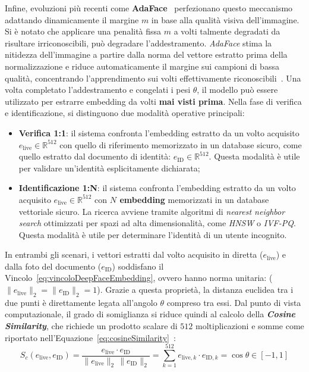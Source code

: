 Infine, evoluzioni più recenti come \textbf{AdaFace}~\cite{kimAdaFaceQualityAdaptive2023} perfezionano questo meccanismo adattando dinamicamente il margine $m$ in base alla qualità visiva dell'immagine. Si è notato che applicare una penalità fissa $m$ a volti talmente degradati da risultare irriconoscibili, può degradare l'addestramento. \textit{AdaFace} stima la nitidezza dell'immagine a partire dalla norma del vettore estratto prima della normalizzazione e riduce automaticamente il margine sui campioni di bassa qualità, concentrando l'apprendimento sui volti effettivamente riconoscibili~\cite{kimAdaFaceQualityAdaptive2023}.
Una volta completato l'addestramento e congelati i pesi $\theta$, il modello può essere utilizzato per estrarre embedding da volti \textbf{mai visti prima}. 
Nella fase di verifica e identificazione, si distinguono due modalità operative principali:
\begin{itemize}
    \item \textbf{Verifica 1:1}: il sistema confronta l'embedding estratto da un volto acquisito $e_{\text{live}} \in \mathbb{R}^{512}$ con quello di riferimento memorizzato in un database sicuro, come quello estratto dal documento di identità: $e_{\text{ID}} \in \mathbb{R}^{512}$. Questa modalità è utile per validare un'identità esplicitamente dichiarata;
    \item \textbf{Identificazione 1:N}: il sistema confronta l'embedding estratto da un volto acquisito $e_{\text{live}} \in \mathbb{R}^{512}$ con \textbf{$N$ embedding} memorizzati in un database vettoriale sicuro. La ricerca avviene tramite algoritmi di \textit{nearest neighbor search} ottimizzati per spazi ad alta dimensionalità, come \textit{HNSW} o \textit{IVF-PQ}. Questa modalità è utile per determinare l'identità di un utente incognito.
\end{itemize}
In entrambi gli scenari, i vettori estratti dal volto acquisito in diretta ($e_{\text{live}}$) e dalla foto del documento ($e_{\text{ID}}$) soddisfano il Vincolo~\eqref{eq:vincoloDeepFaceEmbedding}, ovvero hanno norma unitaria: ($\lVert e_{\text{live}} \rVert_2 = \lVert e_{\text{ID}} \rVert_2 = 1$). 
Grazie a questa proprietà, la distanza euclidea tra i due punti è direttamente legata all'angolo $\theta$ compreso tra essi. 
Dal punto di vista computazionale, il grado di somiglianza si riduce quindi al calcolo della \textbf{\textit{Cosine Similarity}}, che richiede un prodotto scalare di $512$ moltiplicazioni e somme come riportato nell'Equazione~\eqref{eq:cosineSimilarity}~\cite{shiDocFaceMatchingID2018}:
\begin{equation}
\label{eq:cosineSimilarity}
S_c(e_{\text{live}}, e_{\text{ID}}) = \frac{e_{\text{live}} \cdot e_{\text{ID}}}{\lVert e_{\text{live}} \rVert_2 \, \lVert e_{\text{ID}} \rVert_2} = \sum_{k=1}^{512} e_{\text{live}, k} \cdot e_{\text{ID}, k} = \cos\theta \in [-1, 1]
\end{equation}

